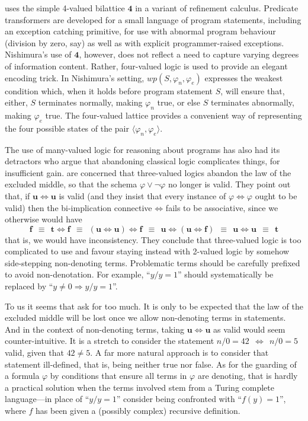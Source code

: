 \documentclass{tlp}
\newcommand{\Quad}{\ensuremath{\mathbf{4}}}
\newcommand{\impl}{\mathbin{\Rightarrow}}
\newcommand{\biim}{\mathbin{\Leftrightarrow}}
\newcommand{\tuple}[1]{\ensuremath{\langle #1 \rangle}}
\begin{document}
 uses the simple 4-valued bilattice
$\Quad$ in a variant of refinement calculus.
Predicate transformers are developed for a small language of
program statements, including an exception catching primitive,
for use with abnormal program behaviour (division by zero, say)
as well as with explicit programmer-raised exceptions.
Nishimura's use of $\Quad$, however,
does not reflect a need to capture
varying degrees of information content.
Rather, four-valued logic is used to provide an elegant encoding trick.
In Nishimura's setting, $wp(S,\varphi_n, \varphi_e)$ expresses the
weakest condition which, when it holds before program statement $S$,
will ensure that, either, $S$ terminates normally, making $\varphi_n$ true,
or else $S$ terminates abnormally, making $\varphi_e$ true.
The four-valued lattice provides a convenient way of representing the
four possible states of the pair $\tuple{\varphi_n, \varphi_e}$.

The use of many-valued logic for reasoning about programs has also
had its detractors who argue that abandoning classical logic
complicates things, for insufficient gain.
 are concerned that
three-valued logics abandon the law of the excluded middle,
so that the schema $\varphi \lor \neg \varphi$ no longer is valid.
They point out that, if $\mathbf{u} \biim \mathbf{u}$ is valid
(and they insist that every instance of $\varphi \biim \varphi$
ought to be valid)
then the bi-implication connective $\biim$
fails to be associative, since we otherwise would have
\[
\textbf{f}~~ \equiv 
~~\textbf{t} \biim \textbf{f}~~ \equiv
~~(\textbf{u} \biim \textbf{u}) \biim \textbf{f}~~ \equiv
~~\textbf{u} \biim (\textbf{u} \biim \textbf{f})~~ \equiv 
~~\textbf{u} \biim \textbf{u}~~ \equiv 
~~\textbf{t}
\]
that is, we would have inconsistency.
They conclude that three-valued logic is too complicated to use
and favour staying instead with 2-valued logic by somehow side-stepping
non-denoting terms.
Problematic terms should be carefully prefixed to avoid non-denotation. 
For example,
``$y/y = 1$'' should systematically be replaced by
``$y \not= 0 \impl y/y = 1$''.

To us it seems that  ask for too much.
It is only to be expected that the law of the excluded middle will
be lost once we allow non-denoting terms in statements. 
And in the context of non-denoting terms, taking 
$\mathbf{u} \biim \mathbf{u}$ as valid would seem counter-intuitive.
It is a stretch to consider the statement 
$n/0 = 42~~ \biim ~~n/0 = 5$ valid,
given that $42 \not= 5$.
A far more natural approach is to consider that statement
ill-defined, that is, being neither true nor false.
As for the guarding of a formula $\varphi$ by conditions that ensure 
all terms in $\varphi$ are denoting,
that is hardly a practical solution when the terms involved stem 
from a Turing complete language---in place of ``$y/y = 1$'' 
consider being confronted with ``$f(y) = 1$'',
where $f$ has been given a (possibly complex) recursive definition.
\end{document}
